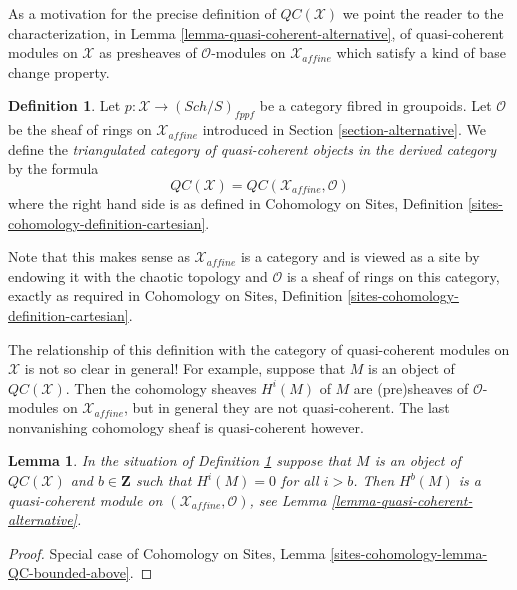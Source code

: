 \documentclass{stacks-project}
\theoremstyle{plain}
\newtheorem{lemma}[subsection]{Lemma}
\theoremstyle{definition}
\newtheorem{definition}[subsection]{Definition}
\theoremstyle{remark}
\numberwithin{equation}{subsection}
\def\Sch{\mathit{Sch}}
\begin{document}
\medskip\noindent
As a motivation for the precise definition of $\mathit{QC}(\mathcal{X})$
we point the reader to the characterization, in
Lemma \ref{lemma-quasi-coherent-alternative},
of quasi-coherent modules on $\mathcal{X}$ as presheaves of
$\mathcal{O}$-modules on $\mathcal{X}_{affine}$ which
satisfy a kind of base change property.

\begin{definition}
\label{definition-QC}
Let $p : \mathcal{X} \to (\Sch/S)_{fppf}$ be a category fibred in groupoids.
Let $\mathcal{O}$ be the sheaf of rings on $\mathcal{X}_{affine}$ introduced
in Section \ref{section-alternative}. We define the
{\it triangulated category of quasi-coherent objects in the derived category}
by the formula
$$
\mathit{QC}(\mathcal{X}) = \mathit{QC}(\mathcal{X}_{affine}, \mathcal{O})
$$
where the right hand side is as defined in
Cohomology on Sites, Definition \ref{sites-cohomology-definition-cartesian}.
\end{definition}

\noindent
Note that this makes sense as $\mathcal{X}_{affine}$ is a category and
is viewed as a site by endowing it with the chaotic topology and
$\mathcal{O}$ is a sheaf of rings on this category, exactly as required in 
Cohomology on Sites, Definition \ref{sites-cohomology-definition-cartesian}.

\medskip\noindent
The relationship of this definition with the category of quasi-coherent
modules on $\mathcal{X}$ is not so clear in general! For example, suppose
that $M$ is an object of $\mathit{QC}(\mathcal{X})$. Then the cohomology
sheaves $H^i(M)$ of $M$ are (pre)sheaves of $\mathcal{O}$-modules on
$\mathcal{X}_{affine}$, but in general they are not quasi-coherent. The last
nonvanishing cohomology sheaf is quasi-coherent however.

\begin{lemma}
\label{lemma-QC-bounded-above}
In the situation of Definition \ref{definition-QC} suppose that
$M$ is an object of $\mathit{QC}(\mathcal{X})$ and $b \in \mathbf{Z}$
such that $H^i(M) = 0$ for all $i > b$.
Then $H^b(M)$ is a quasi-coherent module on
$(\mathcal{X}_{affine}, \mathcal{O})$, see
Lemma \ref{lemma-quasi-coherent-alternative}.
\end{lemma}

\begin{proof}
Special case of
Cohomology on Sites, Lemma \ref{sites-cohomology-lemma-QC-bounded-above}.
\end{proof}
\end{document}
